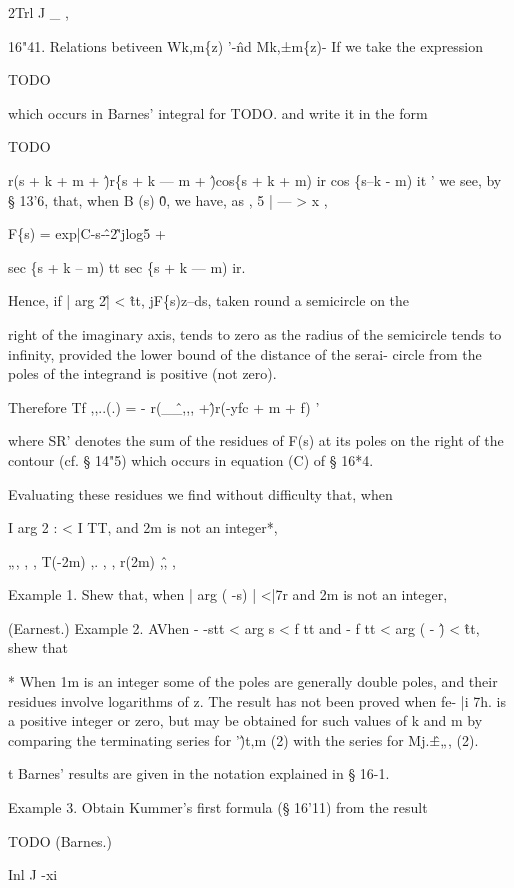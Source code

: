 2Trl J \_ ,

16"41. Relations betiveen Wk,m\{z) '-\^nd Mk,±m\{z)- If we take the
expression

TODO

which occurs in Barnes' integral for TODO. and write it in the form

TODO

r(s + k + m + \^)r\{s + k — m + \^)cos\{s + k + m) ir cos \{s--k - m)
it ' we see, by § 13'6, that, when B (s) \^ 0, we have, as , 5 | — > x
,

F\{s) = exp|C-s-\^-2\^'jlog5 +

sec \{s + k -- m) tt sec \{s + k — m) ir.

Hence, if | arg 2\^ | < \^ tt, jF\{s)z--ds, taken round a semicircle
on the

right of the imaginary axis, tends to zero as the radius of the
semicircle tends to infinity, provided the lower bound of the distance
of the serai- circle from the poles of the integrand is positive (not
zero).

Therefore Tf ,,..(.) = - r(\_\^\_,,, +\^)r(-yfc + m + f) '

where SR' denotes the sum of the residues of F(s) at its poles on the
right of the contour (cf. § 14"5) which occurs in equation (C) of §
16*4.

Evaluating these residues we find without difficulty that, when

I arg 2 : < I TT, and 2m is not an integer*,

„, , , T(-2m) ,. , , r(2m) ,\^ , ,

Example 1. Shew that, when | arg ( -s) | <|7r and 2m is not an
integer,

(Earnest.) Example 2. AVhen - -stt < arg s < f tt and - f tt < arg ( -
\^) < \^tt, shew that

* When 1m is an integer some of the poles are generally double poles,
and their residues involve logarithms of z. The result has not been
proved when fe- |i 7h. is a positive integer or zero, but may be
obtained for such values of k and m by comparing the terminating
series for '\^)t,m (2) with the series for Mj.\^±„, (2).

t Barnes' results are given in the notation explained in § 16-1.

%
%

Example 3. Obtain Kummer's first formula (§ 16'11) from the result

TODO (Barnes.)

Inl J -xi

